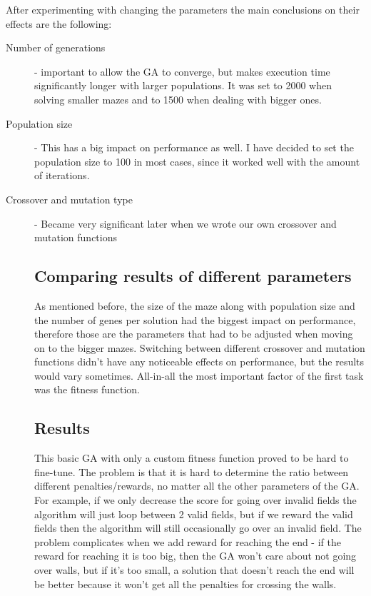 \documentclass{article}
\begin{document}
After experimenting with changing the parameters the main conclusions on their effects are the following: 
\begin{description}

\item[Number of generations] - important to allow the GA to converge, but makes execution time significantly longer with larger populations. It was set to 2000 when solving smaller mazes and to 1500 when dealing with bigger ones.

\item[Population size] - This has a big impact on performance as well. I have decided to set the population size to 100 in most cases, since it worked well with the amount of iterations.

\item[Crossover and mutation type] - Became very significant later when we wrote our own crossover and mutation functions

\subsection{Comparing results of different parameters}
As mentioned before, the size of the maze along with population size and the number of genes per solution had the biggest impact on performance, therefore those are the parameters that had to be adjusted when moving on to the bigger mazes. Switching between different crossover and mutation functions didn't have any noticeable effects on performance, but the results would vary sometimes. All-in-all the most important factor of the first task was the fitness function. 

\subsection{Results}
This basic GA with only a custom fitness function proved to be hard to fine-tune. The problem is that it is hard to determine the ratio between different penalties/rewards, no matter all the other parameters of the GA. For example, if we only decrease the score for going over invalid fields the algorithm will just loop between 2 valid fields, but if we reward the valid fields then the algorithm will still occasionally go over an invalid field. The problem complicates when we add reward for reaching the end - if the reward for reaching it is too big, then the GA won't care about not going over walls, but if it's too small, a solution that doesn't reach the end will be better because it won't get all the penalties for crossing the walls.


\end{description}
\end{document}
